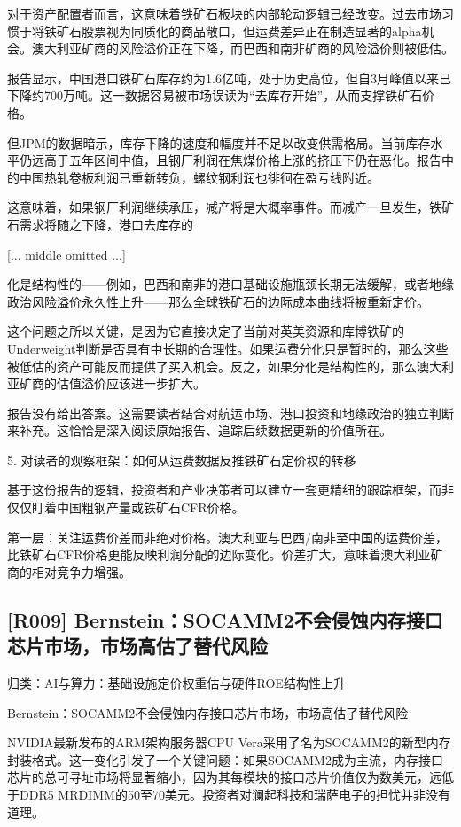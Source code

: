 \documentclass[11pt]{ctexart}
\begin{document}
对于资产配置者而言，这意味着铁矿石板块的内部轮动逻辑已经改变。过去市场习惯于将铁矿石股票视为同质化的商品敞口，但运费差异正在制造显著的alpha机会。澳大利亚矿商的风险溢价正在下降，而巴西和南非矿商的风险溢价则被低估。

报告显示，中国港口铁矿石库存约为1.6亿吨，处于历史高位，但自3月峰值以来已下降约700万吨。这一数据容易被市场误读为“去库存开始”，从而支撑铁矿石价格。

但JPM的数据暗示，库存下降的速度和幅度并不足以改变供需格局。当前库存水平仍远高于五年区间中值，且钢厂利润在焦煤价格上涨的挤压下仍在恶化。报告中的中国热轧卷板利润已重新转负，螺纹钢利润也徘徊在盈亏线附近。

这意味着，如果钢厂利润继续承压，减产将是大概率事件。而减产一旦发生，铁矿石需求将随之下降，港口去库存的

[... middle omitted ...]

化是结构性的——例如，巴西和南非的港口基础设施瓶颈长期无法缓解，或者地缘政治风险溢价永久性上升——那么全球铁矿石的边际成本曲线将被重新定价。

这个问题之所以关键，是因为它直接决定了当前对英美资源和库博铁矿的Underweight判断是否具有中长期的合理性。如果运费分化只是暂时的，那么这些被低估的资产可能反而提供了买入机会。反之，如果分化是结构性的，那么澳大利亚矿商的估值溢价应该进一步扩大。

报告没有给出答案。这需要读者结合对航运市场、港口投资和地缘政治的独立判断来补充。这恰恰是深入阅读原始报告、追踪后续数据更新的价值所在。

5. 对读者的观察框架：如何从运费数据反推铁矿石定价权的转移

基于这份报告的逻辑，投资者和产业决策者可以建立一套更精细的跟踪框架，而非仅仅盯着中国粗钢产量或铁矿石CFR价格。

第一层：关注运费价差而非绝对价格。澳大利亚与巴西/南非至中国的运费价差，比铁矿石CFR价格更能反映利润分配的边际变化。价差扩大，意味着澳大利亚矿商的相对竞争力增强。

\subsection{[R009] Bernstein：SOCAMM2不会侵蚀内存接口芯片市场，市场高估了替代风险}
{\small\color{refgray}归类：AI与算力：基础设施定价权重估与硬件ROE结构性上升}

Bernstein：SOCAMM2不会侵蚀内存接口芯片市场，市场高估了替代风险

NVIDIA最新发布的ARM架构服务器CPU Vera采用了名为SOCAMM2的新型内存封装格式。这一变化引发了一个关键问题：如果SOCAMM2成为主流，内存接口芯片的总可寻址市场将显著缩小，因为其每模块的接口芯片价值仅为数美元，远低于DDR5 MRDIMM的50至70美元。投资者对澜起科技和瑞萨电子的担忧并非没有道理。
\end{document}
